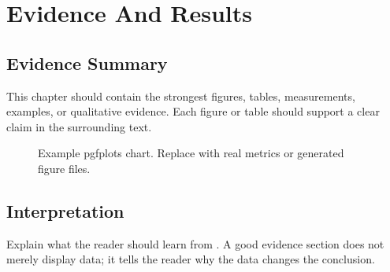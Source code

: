 \chapter{Evidence And Results}

\section{Evidence Summary}

This chapter should contain the strongest figures, tables, measurements, examples, or qualitative evidence. Each figure or table should support a clear claim in the surrounding text.

\begin{figure}[htbp]
\centering
{}
\caption{Example pgfplots chart. Replace with real metrics or generated figure files.}
\label{fig:example-chart}
\end{figure}

\section{Interpretation}

Explain what the reader should learn from . A good evidence section does not merely display data; it tells the reader why the data changes the conclusion.
